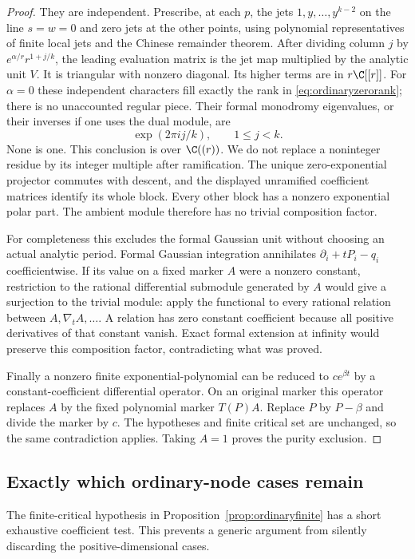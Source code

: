 \begin{proof}
They are independent. Prescribe, at each $p$, the jets
$1,y,\ldots,y^{k-2}$ on the line $s=w=0$ and zero jets at the
other points, using polynomial representatives of finite local
jets and the Chinese remainder theorem. After dividing column
$j$ by $e^{\alpha/r}r^{1+j/k}$, the leading evaluation matrix is
the jet map multiplied by the analytic unit $V$. It is triangular
with nonzero diagonal. Its higher terms are in $r\C[[r]]$.
For $\alpha=0$ these independent characters fill exactly the rank
in \eqref{eq:ordinaryzerorank}; there is no unaccounted regular
piece. Their formal monodromy eigenvalues, or their inverses if
one uses the dual module, are
\[
 \exp(2\pi i j/k),\qquad 1\le j<k.
\]
None is one. This conclusion is over $\C((r))$. We do not replace
a noninteger residue by its integer multiple after ramification.
The unique zero-exponential projector commutes with descent, and
the displayed unramified coefficient matrices identify its whole
block. Every other block has a nonzero exponential polar part.
The ambient module therefore has no trivial composition factor.

For completeness this excludes the formal Gaussian unit without
choosing an actual analytic period. Formal Gaussian integration
annihilates $\partial_i+tP_i-q_i$ coefficientwise. If its value
on a fixed marker $A$ were a nonzero constant, restriction to the
rational differential submodule generated by $A$ would give a
surjection to the trivial module: apply the functional to every
rational relation between $A,\nabla_tA,\ldots$. A relation has
zero constant coefficient because all positive derivatives of
that constant vanish. Exact formal extension at infinity would
preserve this composition factor, contradicting what was proved.

Finally a nonzero finite exponential-polynomial can be reduced
to $c e^{\beta t}$ by a constant-coefficient differential
operator. On an original marker this operator replaces $A$ by
the fixed polynomial marker $T(P)A$. Replace $P$ by $P-\beta$
and divide the marker by $c$. The hypotheses and finite critical
set are unchanged, so the same contradiction applies. Taking
$A=1$ proves the purity exclusion.
\end{proof}

\subsection{Exactly which ordinary-node cases remain}

The finite-critical hypothesis in Proposition~\ref{prop:ordinaryfinite}
has a short exhaustive coefficient test. This prevents a generic
argument from silently discarding the positive-dimensional cases.

